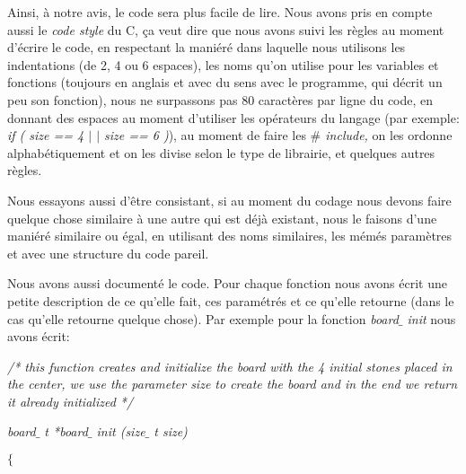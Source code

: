 \documentclass[a4paper,12pt]{article}
\begin{document}
\begin{justify}
Ainsi, à notre avis, le code sera plus facile de lire. Nous avons pris en compte aussi le \textit{code style} du C, ça veut dire que nous avons suivi les règles au moment d’écrire le code, en respectant la maniéré dans laquelle nous utilisons les indentations (de 2, 4 ou 6 espaces), les noms qu’on utilise pour les variables et fonctions (toujours en anglais et avec du sens avec le programme, qui décrit un peu son fonction), nous ne surpassons pas 80 caractères par ligne du code, en donnant des espaces au moment d’utiliser les opérateurs du langage (par exemple:\textit{ if ( size == 4 $ \vert $ $ \vert $  size == 6 )}), au moment de faire les \textit{$\#$ include, }on les ordonne alphabétiquement et on les divise selon le type de librairie, et quelques autres règles.
\end{justify}\par


\begin{justify}
Nous essayons aussi d’être consistant, si au moment du codage nous devons faire quelque chose similaire à une autre qui est déjà existant, nous le faisons d’une maniéré similaire ou égal, en utilisant des noms similaires, les mémés paramètres et avec une structure du code pareil.
\end{justify}\par


\begin{justify}
Nous avons aussi documenté le code. Pour chaque fonction nous avons écrit une petite description de ce qu’elle fait, ces paramétrés et ce qu’elle retourne (dans le cas qu’elle retourne quelque chose). Par exemple pour la fonction \textit{board$ \_ $ init }nous avons écrit: 
\end{justify}\par


\begin{justify}
\textit{/* this function creates and initialize the board with the 4 initial stones placed in the center, we use the parameter size to create the board and in the end we return it already initialized */ }
\end{justify}\par

\begin{justify}
\textit{board$ \_ $ t *board$ \_ $ init (size$ \_ $ t size)}
\end{justify}\par

\begin{justify}
\textit{$ \{ $ }
\end{justify}\par
\end{document}
